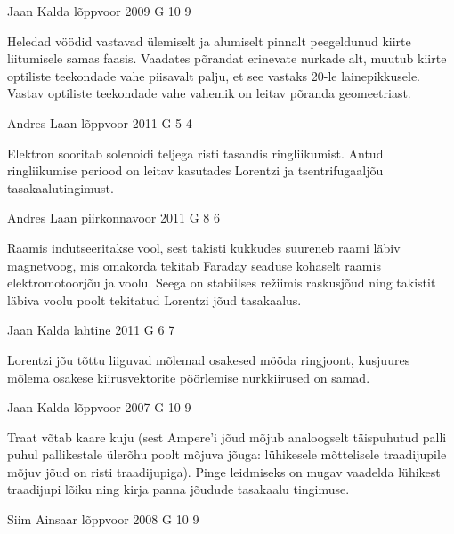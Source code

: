 \documentclass[11pt]{article}
\begin{document}
{%
{Jaan Kalda} %
{lõppvoor} %
{2009} %
{G 10} %
{9} %
{

\ifHint
Heledad vöödid vastavad ülemiselt ja alumiselt pinnalt peegeldunud kiirte liitumisele samas faasis. Vaadates põrandat erinevate nurkade alt, muutub kiirte optiliste teekondade vahe piisavalt palju, et see vastaks \num{20}-le lainepikkusele. Vastav optiliste teekondade vahe vahemik on leitav põranda geomeetriast.
\fi
}

{Andres Laan} %
{lõppvoor} %
{2011} %
{G 5} %
{4} %
{

\ifHint
Elektron sooritab solenoidi teljega risti tasandis ringliikumist. Antud ringliikumise periood on leitav kasutades Lorentzi ja tsentrifugaaljõu tasakaalutingimust.
\fi
}

{Andres Laan} %
{piirkonnavoor} %
{2011} %
{G 8} %
{6} %
{

\ifHint
Raamis indutseeritakse vool, sest takisti kukkudes suureneb raami läbiv magnetvoog, mis omakorda tekitab Faraday seaduse kohaselt raamis elektromotoorjõu ja voolu. Seega on stabiilses režiimis raskusjõud ning takistit läbiva voolu poolt tekitatud Lorentzi jõud tasakaalus.
\fi
}

{Jaan Kalda} %
{lahtine} %
{2011} %
{G 6} %
{7} %
{

\ifHint
Lorentzi jõu tõttu liiguvad mõlemad osakesed mööda ringjoont, kusjuures mõlema osakese kiirusvektorite pöörlemise nurkkiirused on samad.
\fi
}

{Jaan Kalda} %
{lõppvoor} %
{2007} %
{G 10} %
{9} %
{

\ifHint
Traat võtab kaare kuju (sest Ampere’i jõud mõjub analoogselt täispuhutud palli puhul pallikestale ülerõhu poolt mõjuva jõuga: lühikesele mõttelisele traadijupile mõjuv jõud on risti traadijupiga). Pinge leidmiseks on mugav vaadelda lühikest traadijupi lõiku ning kirja panna jõudude tasakaalu tingimuse.
\fi
}

{Siim Ainsaar} %
{lõppvoor} %
{2008} %
{G 10} %
{9} %
{

}}
\end{document}
